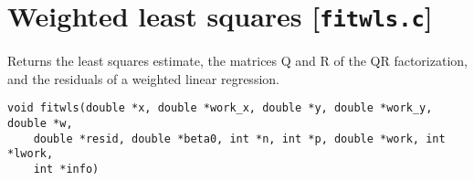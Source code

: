 \documentclass[a4paper,oneside,10pt,DIV=12]{scrartcl}
\begin{document}
\clearpage
\section{Weighted least squares [\texttt{fitwls.c}]}
\begin{Description}
	Returns the least squares estimate, the matrices Q and R of the QR
	factorization, and the residuals of a weighted linear regression.
\end{Description}
\begin{Usage}
\begin{verbatim}
void fitwls(double *x, double *work_x, double *y, double *work_y, double *w,
    double *resid, double *beta0, int *n, int *p, double *work, int *lwork,
    int *info)
\end{verbatim}
\end{Usage}
\end{document}
